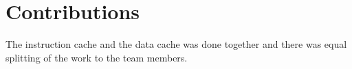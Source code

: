 \section{Contributions}
  The instruction cache and the data cache was done together and there was equal splitting of the work to the team members.